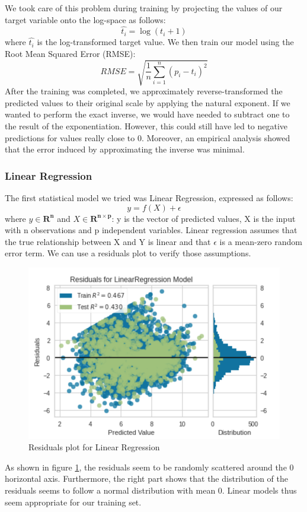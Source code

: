 \documentclass[sigplan,screen]{acmart}
\begin{document}
We took care of this problem during training by projecting the values of our target variable onto the log-space as follows:
\begin{equation}
    \hat{t_{i}} = \log(t_{i} + 1)
\end{equation}
where $\hat{t_{i}}$ is the log-transformed target value. We then train our model using the Root Mean Squared Error (RMSE):
\begin{equation}
    RMSE = \sqrt{\frac{1}{n}\sum_{i=1}^{n}(p_{i} - t_{i})^{2}}
\end{equation}
After the training was completed, we approximately reverse-transformed the predicted values to their original scale by applying the natural exponent. If we wanted to perform the exact inverse, we would have needed to subtract one to the result of the exponentiation. However, this could still have led to negative predictions for values really close to 0. Moreover, an empirical analysis showed that the error induced by approximating the inverse was minimal.

\subsubsection{Linear Regression}
The first statistical model we tried was Linear Regression, expressed as follows:
\begin{equation}
    y = f(X) + \epsilon
\end{equation}
where $y \in \mathbf{R^{n}}$ and $X \in \mathbf{R^{n \times p}}$: y is the vector of predicted values, X is the input with n observations and p independent variables. Linear regression assumes that the true relationship between X and Y is linear and that $\epsilon$ is a mean-zero random error term. We can use a residuals plot to verify those assumptions.
\begin{figure}[H]
\centering
\includegraphics[width=\columnwidth, scale=0.5]{residuals_plot_lr.png}
\caption{Residuals plot for Linear Regression}
\label{residuals}
\end{figure}
As shown in figure \ref{residuals}, the residuals seem to be randomly scattered around the 0 horizontal axis. Furthermore, the right part shows that the distribution of the residuals seems to follow a normal distribution with mean 0. Linear models thus seem appropriate for our training set.
\end{document}
